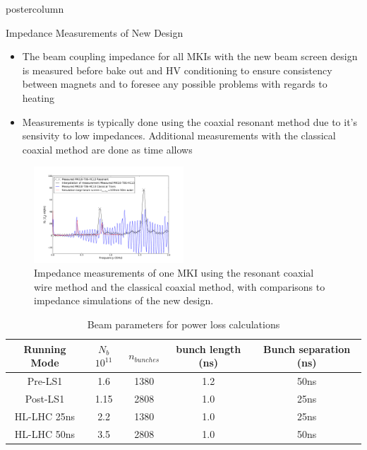 \documentclass[final,hyperref={pdfpagelabels=false}]{beamer}
\newlength{\columnheight}
\begin{document}
\begin{frame}
\begin{columns}
    \begin{column}{.49\textwidth}
      \begin{beamercolorbox}[center,wd=\textwidth]{postercolumn}
        \begin{minipage}[T]{.95\textwidth} %
          \parbox[t][\columnheight]{\textwidth}{ %
\begin{block}{Impedance Measurements of New Design}
\begin{itemize}
\item{The beam coupling impedance for all MKIs with the new beam screen design is measured before bake out and HV conditioning to ensure consistency between magnets and to foresee any possible problems with regards to heating}
\item{Measurements is typically done using the coaxial resonant method due to it's sensivity to low impedances. Additional measurements with the classical coaxial method are done as time allows}
\end{itemize}
\begin{figure}
\includegraphics[width=0.5\textwidth]{figures/compTransmissionResSimulations.pdf}
\caption{\small{Impedance measurements of one MKI using the resonant coaxial wire method and the classical coaxial method, with comparisons to impedance simulations of the new design.}}
\end{figure}
\begin{table}
\label{tab:beamPar}
\caption{Beam parameters for power loss calculations}
\begin{center}
\begin{tabular}{c | c | c | c | c}
\small{Running Mode} & $N_{b}$ $10^{11}$ & $n_{bunches}$ & bunch length (ns) & Bunch separation (ns) \\ \hline 
\small{Pre-LS1} & 1.6 & 1380 & 1.2 & 50ns \\ \hline
\small{Post-LS1} & 1.15 & 2808 & 1.0 & 25ns \\ \hline
\small{HL-LHC 25ns}& 2.2 & 1380 & 1.0 & 25ns \\ \hline
\small{HL-LHC 50ns}& 3.5 & 2808 & 1.0 & 50ns \\
\end{tabular}
\end{center}
\end{table}


\end{block}}
\end{minipage}
\end{beamercolorbox}
\end{column}
\end{columns}
\end{frame}
\end{document}
